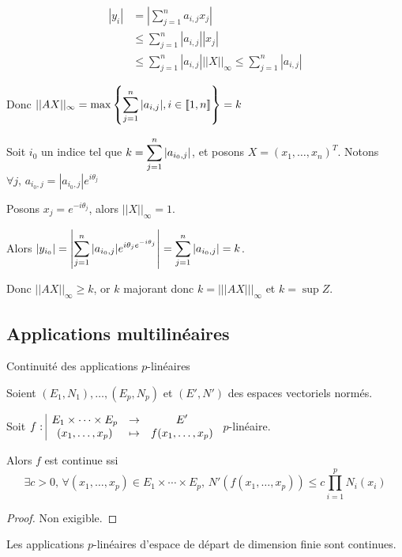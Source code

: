 \begin{align*}
    |y_i| & = \left| \sum_{j=1}^n a_{i, j} x_j \right| \\
    & \leqslant \sum_{j=1}^n |a_{i, j}| |x_j| \\
    & \leqslant \sum_{j=1}^n |a_{i, j}| ||X||_\infty \leqslant \sum_{j=1}^n |a_{i, j}|
\end{align*}

Donc $\displaystyle ||AX||_\infty = \max \left\{ \sum_{j = 1 }^{n } |a_{i, j}|, i \in [\![1, n]\!]  \right\} = k$

Soit $i_0$ un indice tel que $\displaystyle k = \sum_{j=1}^n |a_{i_0, j}|$, et posons 
$X = (x_1, \ldots, x_n)^T$. Notons $\forall j, \, a_{i_0, j} = |a_{i_0, j}| e^{i \theta_j}$ 

Posons $x_j = e^{-i \theta_j}$, alors $||X||_\infty = 1$.

Alors $\displaystyle |y_{i_0}| = \left|\sum_{j = 1 }^{n } | a_{i_0, j} | e^{i \theta_j e^{-i \theta_j}}\right| = \sum_{j=1}^n |a_{i_0, j}| = k$.

Donc $|| AX||_\infty \geqslant k$, or $k$ majorant donc $k = |||AX |||_\infty$ et $k = \sup Z$. 

\subsection{Applications multilinéaires}

\begin{theoreme}{Continuité des applications $p$-linéaires}{}

    Soient $(E_1, N_1), \ldots, (E_p, N_p)$ et $(E', N')$ des espaces vectoriels normés.
    
    Soit $f: \space \begin{array}{|ccc} \displaystyle E_1 \times \cdots \times E_p & \to & \displaystyle E' \\ \displaystyle (x_1, \ldots, x_p) & \mapsto & \displaystyle f(x_1, \ldots, x_p) \end{array}$ 
    $p$-linéaire. 

    \avspace Alors $f$ est continue ssi
    \[\exists c > 0, \, \forall (x_1, \ldots, x_p) \in E_1 \times \cdots \times E_p, \, N'(f(x_1, \ldots, x_p)) \leqslant c \prod_{i=1}^p N_i(x_i)\]
\end{theoreme}

\begin{proof}
    Non exigible.
\end{proof}

\begin{proposition}{}{}
    Les applications $p$-linéaires d'espace de départ de dimension finie sont continues.
\end{proposition}

